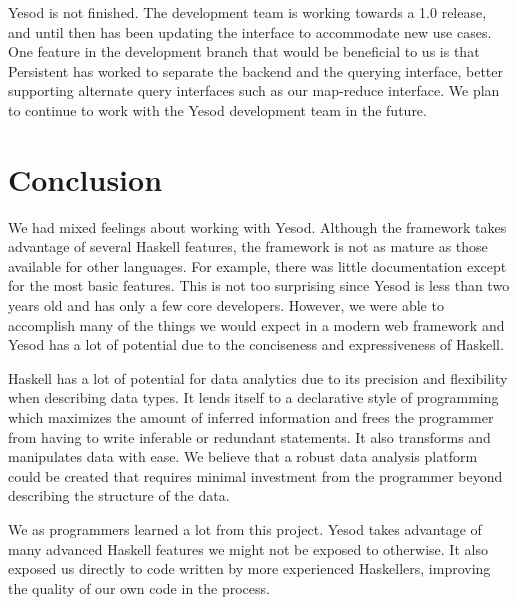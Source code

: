 \documentclass[letterpaper,twocolumn,9pt]{article}
\begin{document}
Yesod is not finished.  The development team is working towards a 1.0 release, and until then has been updating the interface to accommodate new use cases.  One feature in the development branch that would be beneficial to us is that Persistent has worked to separate the backend and the querying interface, better supporting alternate query interfaces such as our map-reduce interface.  We plan to continue to work with the Yesod development team in the future.

\section{Conclusion}
\label{conclusion}

We had mixed feelings about working with Yesod. Although the framework takes advantage of several Haskell features, the framework is not as mature as those available for other languages. For example, there was little documentation except for the most basic features. This is not too surprising since Yesod is less than two years old and has only a few core developers.  However, we were able to accomplish many of the things we would expect in a modern web framework and Yesod has a lot of potential due to the conciseness and expressiveness of Haskell.

Haskell has a lot of potential for data analytics due to its precision and flexibility when describing data types.  It lends itself to a declarative style of programming which maximizes the amount of inferred information and frees the programmer from having to write inferable or redundant statements.  It also transforms and manipulates data with ease.  We believe that a robust data analysis platform could be created that requires minimal investment from the programmer beyond describing the structure of the data.

We as programmers learned a lot from this project. Yesod takes advantage of many advanced Haskell features we might not be exposed to otherwise.  It also exposed us directly to code written by more experienced Haskellers, improving the quality of our own code in the process.

{\footnotesize 
}
\end{document}
